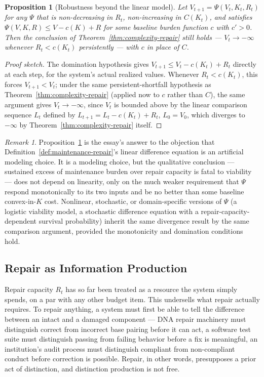 \documentclass[11pt,a4paper]{article}
\theoremstyle{plain}
\newtheorem{proposition}[theorem]{Proposition}
\theoremstyle{definition}
\theoremstyle{remark}
\newtheorem{remark}[theorem]{Remark}
\begin{document}
\begin{proposition}[Robustness beyond the linear model]
\label{prop:robustness-general}
Let $V_{t+1} = \Psi(V_t, K_t, R_t)$ for any $\Psi$ that is non-decreasing in $R_t$, non-increasing in $C(K_t)$, and satisfies $\Psi(V,K,R) \le V - c(K) + R$ for some baseline burden function $c$ with $c' > 0$. Then the conclusion of Theorem~\ref{thm:complexity-repair} still holds — $V_t \to -\infty$ whenever $R_t < c(K_t)$ persistently — with $c$ in place of $C$.
\end{proposition}

\begin{proof}[Proof sketch]
The domination hypothesis gives $V_{t+1} \le V_t - c(K_t) + R_t$ directly at each step, for the system's actual realized values. Whenever $R_t < c(K_t)$, this forces $V_{t+1} < V_t$; under the same persistent-shortfall hypothesis as Theorem~\ref{thm:complexity-repair} (applied now to $c$ rather than $C$), the same argument gives $V_t \to -\infty$, since $V_t$ is bounded above by the linear comparison sequence $L_t$ defined by $L_{t+1}=L_t - c(K_t) + R_t$, $L_0 = V_0$, which diverges to $-\infty$ by Theorem~\ref{thm:complexity-repair} itself.
\end{proof}

\begin{remark}
Proposition~\ref{prop:robustness-general} is the essay's answer to the objection that Definition~\ref{def:maintenance-repair}'s linear difference equation is an artificial modeling choice. It is a modeling choice, but the qualitative conclusion — sustained excess of maintenance burden over repair capacity is fatal to viability — does not depend on linearity, only on the much weaker requirement that $\Psi$ respond monotonically to its two inputs and be no better than some baseline convex-in-$K$ cost. Nonlinear, stochastic, or domain-specific versions of $\Psi$ (a logistic viability model, a stochastic difference equation with a repair-capacity-dependent survival probability) inherit the same divergence result by the same comparison argument, provided the monotonicity and domination conditions hold.
\end{remark}

\subsection{Repair as Information Production}
\label{subsec:repair-as-information}

Repair capacity $R_t$ has so far been treated as a resource the system simply spends, on a par with any other budget item. This undersells what repair actually requires. To repair anything, a system must first be able to tell the difference between an intact and a damaged component — DNA repair machinery must distinguish correct from incorrect base pairing before it can act, a software test suite must distinguish passing from failing behavior before a fix is meaningful, an institution's audit process must distinguish compliant from non-compliant conduct before correction is possible. Repair, in other words, presupposes a prior act of distinction, and distinction production is not free.
\end{document}
